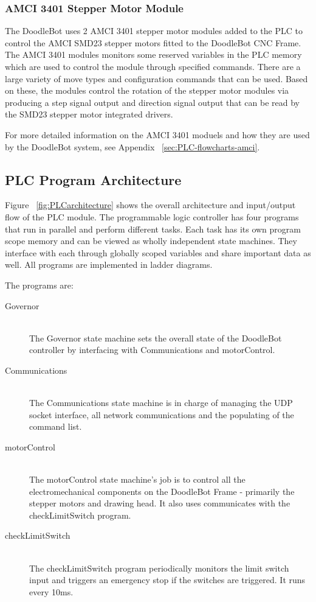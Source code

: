 	\subsubsection{AMCI 3401 Stepper Motor Module}
		The DoodleBot uses 2 AMCI 3401 stepper motor modules added to the PLC to control the AMCI SMD23 stepper motors fitted to the DoodleBot CNC Frame. The AMCI 3401 modules monitors some reserved variables in the PLC memory which are used to control the module through specified commands. There are a large variety of move types and configuration commands that can be used. Based on these, the modules control the rotation of the stepper motor modules via producing a step signal output and direction signal output that can be read by the SMD23 stepper motor integrated drivers.
		
		For more detailed information on the AMCI 3401 moduels and how they are used by the DoodleBot system, see Appendix ~\ref{sec:PLC-flowcharts-amci}.
\subsection{PLC Program Architecture}
		Figure ~\ref{fig:PLCarchitecture} shows the overall architecture and input/output flow of the PLC module. The programmable logic controller has four programs that run in parallel and perform different tasks. Each task has its own program scope memory and can be viewed as wholly independent state machines. They interface with each through globally scoped variables and share important data as well. All programs are implemented in ladder diagrams. 
		
		The programs are:	
		\begin{description}
			\item[Governor] \hfill \\
				The Governor state machine sets the overall state of the DoodleBot controller by interfacing with Communications and motorControl.
			\item[Communications] \hfill \\
				The Communications state machine is in charge of managing the UDP socket interface, all network communications and the populating of the command list.
			\item[motorControl] \hfill \\
				The motorControl state machine's job is to control all the electromechanical components on the DoodleBot Frame - primarily the stepper motors and drawing head. It also uses communicates with the checkLimitSwitch program.
			\item[checkLimitSwitch] \hfill \\
				The checkLimitSwitch program periodically monitors the limit switch input and triggers an emergency stop if the switches are triggered. It runs every 10ms.
		\end{description}
		
